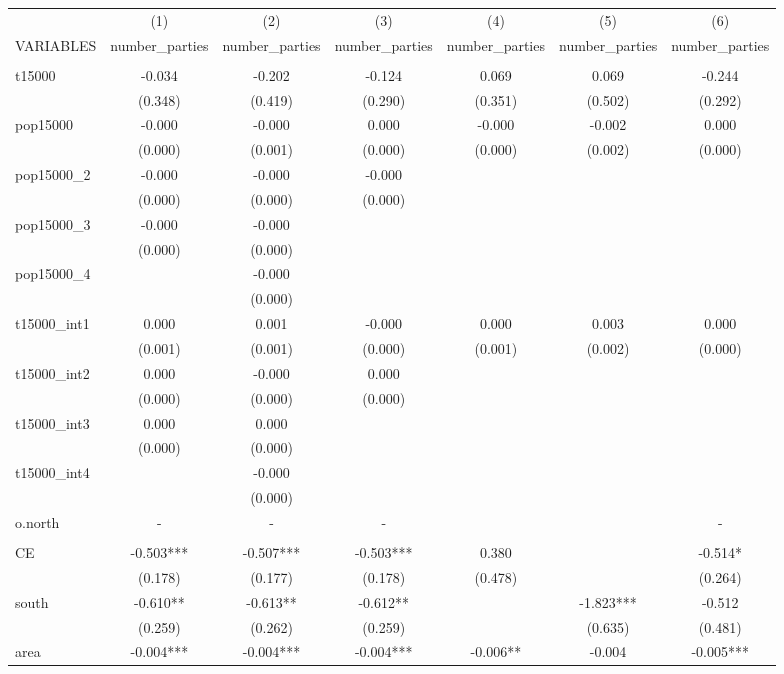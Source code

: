 \documentclass[]{article}
\begin{document}
\begin{tabular}{lcccccc} \hline
 & (1) & (2) & (3) & (4) & (5) & (6) \\
VARIABLES & number\_parties & number\_parties & number\_parties & number\_parties & number\_parties & number\_parties \\ \hline
 &  &  &  &  &  &  \\
t15000 & -0.034 & -0.202 & -0.124 & 0.069 & 0.069 & -0.244 \\
 & (0.348) & (0.419) & (0.290) & (0.351) & (0.502) & (0.292) \\
pop15000 & -0.000 & -0.000 & 0.000 & -0.000 & -0.002 & 0.000 \\
 & (0.000) & (0.001) & (0.000) & (0.000) & (0.002) & (0.000) \\
pop15000\_2 & -0.000 & -0.000 & -0.000 &  &  &  \\
 & (0.000) & (0.000) & (0.000) &  &  &  \\
pop15000\_3 & -0.000 & -0.000 &  &  &  &  \\
 & (0.000) & (0.000) &  &  &  &  \\
pop15000\_4 &  & -0.000 &  &  &  &  \\
 &  & (0.000) &  &  &  &  \\
t15000\_int1 & 0.000 & 0.001 & -0.000 & 0.000 & 0.003 & 0.000 \\
 & (0.001) & (0.001) & (0.000) & (0.001) & (0.002) & (0.000) \\
t15000\_int2 & 0.000 & -0.000 & 0.000 &  &  &  \\
 & (0.000) & (0.000) & (0.000) &  &  &  \\
t15000\_int3 & 0.000 & 0.000 &  &  &  &  \\
 & (0.000) & (0.000) &  &  &  &  \\
t15000\_int4 &  & -0.000 &  &  &  &  \\
 &  & (0.000) &  &  &  &  \\
o.north & - & - & - &  &  & - \\
 &  &  &  &  &  &  \\
CE & -0.503*** & -0.507*** & -0.503*** & 0.380 &  & -0.514* \\
 & (0.178) & (0.177) & (0.178) & (0.478) &  & (0.264) \\
south & -0.610** & -0.613** & -0.612** &  & -1.823*** & -0.512 \\
 & (0.259) & (0.262) & (0.259) &  & (0.635) & (0.481) \\
area & -0.004*** & -0.004*** & -0.004*** & -0.006** & -0.004 & -0.005*** \\

\end{tabular}
\end{document}
